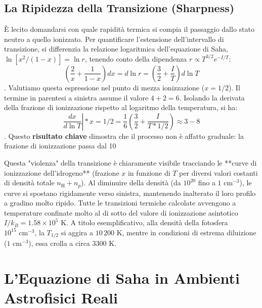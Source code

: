 \subsection{La Ripidezza della Transizione (Sharpness)}
È lecito domandarsi con quale rapidità termica si compia il passaggio dallo stato neutro a quello ionizzato. Per quantificare l'estensione dell'intervallo di transizione, si differenzia la relazione logaritmica dell'equazione di Saha, $\ln[x^2/(1-x)] = \ln r$, tenendo conto della dipendenza $r \propto T^{3/2}e^{-I/T}$:
\begin{equation}
\left( \frac{2}{x} + \frac{1}{1-x} \right) dx = d\ln r = \left( \frac{3}{2} + \frac{I}{T} \right) d\ln T
\end{equation}
.
Valutiamo questa espressione nel punto di mezza ionizzazione ($x = 1/2$). Il termine in parentesi a sinistra assume il valore $4 + 2 = 6$. Isolando la derivata della frazione di ionizzazione rispetto al logaritmo della temperatura, si ha:
\begin{equation}
\left. \frac{dx}{d\ln T} \right|*{x=1/2} = \frac{1}{6} \left( \frac{3}{2} + \frac{I}{T*{1/2}} \right) \approx 3-8
\end{equation}
.
Questo \textbf{risultato chiave} dimostra che il processo non è affatto graduale: la frazione di ionizzazione passa dal 10%

Questa "violenza" della transizione è chiaramente visibile tracciando le **curve di ionizzazione dell'idrogeno** (frazione $x$ in funzione di $T$ per diversi valori costanti di densità totale $n_{\text{H}} + n_p$). Al diminuire della densità (da $10^{20}$ fino a $1 \text{ cm}^{-3}$), le curve si spostano rigidamente verso sinistra, mantenendo inalterato il loro profilo a gradino molto ripido. Tutte le transizioni termiche calcolate avvengono a temperature confinate molto al di sotto del valore di ionizzazione asintotico $I/k_B = 1.58 \times 10^5 \text{ K}$. A titolo esemplificativo, alla densità della fotosfera $10^{15} \text{ cm}^{-3}$, la $T_{1/2}$ si aggira a $10\,200 \text{ K}$, mentre in condizioni di estrema diluizione ($1 \text{ cm}^{-3}$), essa crolla a circa $3300 \text{ K}$.

\section{L'Equazione di Saha in Ambienti Astrofisici Reali}

